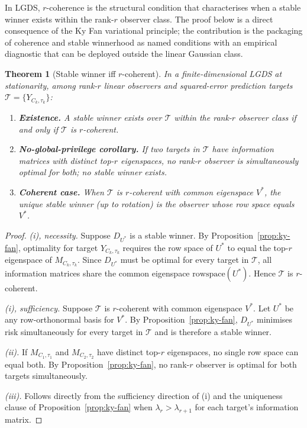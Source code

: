 \documentclass[11pt]{article}
\newtheorem{theorem}{Theorem}[section]
\begin{document}
In LGDS, $r$-coherence is the structural condition that characterises
when a stable winner exists within the rank-$r$ observer class.
The proof below is a direct consequence of the Ky Fan variational
principle; the contribution is the packaging of coherence and stable
winnerhood as named conditions with an empirical diagnostic that can
be deployed outside the linear Gaussian class.

\begin{theorem}[Stable winner iff $r$-coherent]
\label{thm:main}
In a finite-dimensional LGDS at stationarity,
among rank-$r$ linear observers and squared-error prediction targets
$\mathcal{T} = \{Y_{C_k,\tau_k}\}$:
\begin{enumerate}[label=(\roman*)]
    \item \textbf{Existence.}
    A stable winner exists over $\mathcal{T}$ within the rank-$r$ observer
    class if and only if $\mathcal{T}$ is $r$-coherent.

    \item \textbf{No-global-privilege corollary.}
    If two targets in $\mathcal{T}$ have information matrices with distinct
    top-$r$ eigenspaces, no rank-$r$ observer is simultaneously optimal for
    both; no stable winner exists.

    \item \textbf{Coherent case.}
    When $\mathcal{T}$ is $r$-coherent with common eigenspace $V^*$,
    the unique stable winner (up to rotation) is the observer whose row
    space equals $V^*$.
\end{enumerate}
\end{theorem}

\begin{proof}
\emph{(i), necessity.}
Suppose $D_{U^*}$ is a stable winner.
By Proposition~\ref{prop:ky-fan}, optimality for target $Y_{C_k,\tau_k}$
requires the row space of $U^*$ to equal the top-$r$ eigenspace of
$M_{C_k,\tau_k}$.
Since $D_{U^*}$ must be optimal for every target in $\mathcal{T}$,
all information matrices share the common eigenspace $\mathrm{rowspace}(U^*)$.
Hence $\mathcal{T}$ is $r$-coherent.

\emph{(i), sufficiency.}
Suppose $\mathcal{T}$ is $r$-coherent with common eigenspace $V^*$.
Let $U^*$ be any row-orthonormal basis for $V^*$.
By Proposition~\ref{prop:ky-fan}, $D_{U^*}$ minimises risk simultaneously
for every target in $\mathcal{T}$ and is therefore a stable winner.

\emph{(ii).}
If $M_{C_1,\tau_1}$ and $M_{C_2,\tau_2}$ have distinct top-$r$ eigenspaces,
no single row space can equal both.
By Proposition~\ref{prop:ky-fan}, no rank-$r$ observer is optimal for both
targets simultaneously.

\emph{(iii).}
Follows directly from the sufficiency direction of (i) and the uniqueness
clause of Proposition~\ref{prop:ky-fan} when $\lambda_r > \lambda_{r+1}$
for each target's information matrix.
\end{proof}
\end{document}

